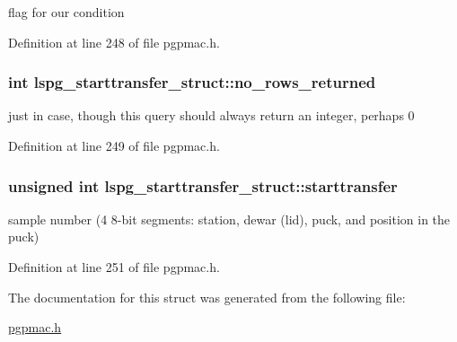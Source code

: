 flag for our condition 



Definition at line 248 of file pgpmac.\-h.

\hypertarget{structlspg__starttransfer__struct_aa384ccd326d9247317f77072b93f94ca}{
\subsubsection[{no\-\_\-rows\-\_\-returned}]{\setlength{\rightskip}{0pt plus 5cm}int lspg\-\_\-starttransfer\-\_\-struct\-::no\-\_\-rows\-\_\-returned}}\label{structlspg__starttransfer__struct_aa384ccd326d9247317f77072b93f94ca}


just in case, though this query should always return an integer, perhaps 0 



Definition at line 249 of file pgpmac.\-h.

\hypertarget{structlspg__starttransfer__struct_af01b6bac6db9830719aef63e552312eb}{
\subsubsection[{starttransfer}]{\setlength{\rightskip}{0pt plus 5cm}unsigned int lspg\-\_\-starttransfer\-\_\-struct\-::starttransfer}}\label{structlspg__starttransfer__struct_af01b6bac6db9830719aef63e552312eb}


sample number (4 8-\/bit segments\-: station, dewar (lid), puck, and position in the puck) 



Definition at line 251 of file pgpmac.\-h.



The documentation for this struct was generated from the following file\-:\begin{DoxyCompactItemize}
\item 
\hyperlink{pgpmac_8h}{pgpmac.\-h}\end{DoxyCompactItemize}
